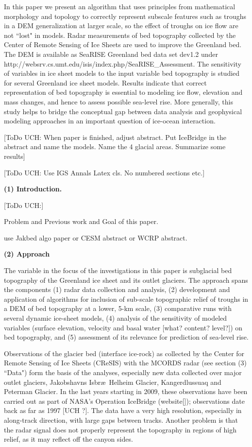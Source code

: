 \documentclass[11pt]{article}
\begin{document}
In this paper we present an algorithm that uses principles from mathematical morphology and topology to correctly
represent subscale features such as troughs in a DEM generalization at larger scale, so the effect of troughs on ice flow are not ``lost" in models. Radar measurements of bed topography collected by the Center of Remote Sensing of Ice Sheets are used to improve the Greenland bed. The DEM is available as SeaRISE Greenland bed data set dev1.2 under
http://websrv.cs.umt.edu/isis/index.php/SeaRISE\_Assessment.
The sensitivity of variables in ice sheet models to the input variable bed topography is studied for several Greenland ice sheet models. Results indicate that correct representation of bed topography is essential to modeling ice flow, elevation and mass changes, and hence to assess possible sea-level rise. 
 More generally,  this study helps to bridge the conceptual gap between data analysis and geophysical modeling approaches in an important question  of ice-ocean interaction. 
 
 \vb
 
 [ToDo UCH: When paper is finished, adjust abstract. Put IceBridge in the abstract and name the models. 
 Name the 4 glacial areas. Summarize some results]
 
 [ToDo UCH: Use IGS Annals Latex cls. No numbered sections etc.]
 
 \bs
 {\bf (1) Introduction.} 
 
  [ToDo UCH:]
 
 
 Problem and Previous work and Goal of this paper.
 
 use Jakbed algo paper or CESM abstract or WCRP abstract. 
 
 \bs
 {\bf (2) Approach}

The variable in the focus of the investigations in this paper is subglacial bed topography of the Greenland ice
sheet and its outlet glaciers.
The approach spans the components (1) radar data collection and analysis, (2) development and application of algorithms for inclusion of sub-scale topographic relief of troughs in a DEM of bed topography at a lower, 5-km scale, (3) comparative runs with several dynamic ice-sheet models, (4) analysis of the sensitivity of 
modeled  variables (surface elevation, velocity and basal water [what? content? level?]) on bed topography, and (5) assessment of its relevance for prediction of sea-level rise.

Observations of the glacier bed (interface ice-rock) as collected by the Center for Remote Sensing of 
Ice Sheets (CReSIS) with the MCORDS radar (see section (3) ``Data") form the basis of the analyses, especially new data collected over major outlet glaciers, Jakobshavns Isbr\ae\, Helheim Glacier, Kangerdlussuaq and 
Peterman Glacier. In the last years starting in 2009, these observations have been carried out as part of NASA's Operation IceBridge (website[]); observations date back as far as 1997 [UCH ?]. The data have a very high resolution, especially in along-track direction, with large gaps between tracks. Another problem is that
the radar signal does not properly represent the topography in regions of high relief, as it may reflect off the canyon sides. 
\end{document}
